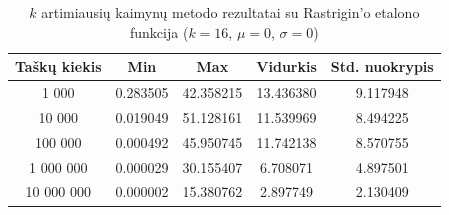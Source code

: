 \begin{table}[H]
    \centering
    \begin{tabular}{|c|c|c|c|c|}
        \hline
        \textbf{Taškų kiekis} & \textbf{Min} & \textbf{Max} & \textbf{Vidurkis} & \textbf{Std. nuokrypis} \\ \hline
        1 000        & 0.283505 & 42.358215 & 13.436380 & 9.117948 \\ \hline
        10 000       & 0.019049 & 51.128161 & 11.539969 & 8.494225 \\ \hline
        100 000      & 0.000492 & 45.950745 & 11.742138 & 8.570755 \\ \hline
        1 000 000    & 0.000029 & 30.155407 & 6.708071 & 4.897501 \\ \hline
        10 000 000   & 0.000002 & 15.380762 & 2.897749 & 2.130409 \\ \hline
    \end{tabular}
    \caption{$k$ artimiausių kaimynų metodo rezultatai su Rastrigin'o etalono funkcija ($k = 16$, $\mu = 0$, $\sigma = 0$)}
\end{table}